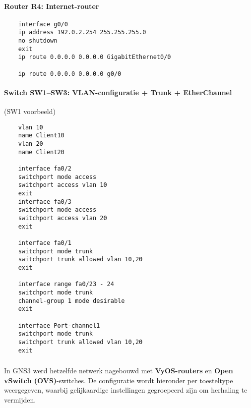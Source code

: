 \vspace{0.3cm}

\paragraph{Router R4: Internet-router}
\begin{verbatim}
    interface g0/0
    ip address 192.0.2.254 255.255.255.0
    no shutdown
    exit
    ip route 0.0.0.0 0.0.0.0 GigabitEthernet0/0
    
    ip route 0.0.0.0 0.0.0.0 g0/0
\end{verbatim}

\vspace{0.3cm}
\paragraph{Switch SW1–SW3: VLAN-configuratie + Trunk + EtherChannel}
(SW1 voorbeeld)
\begin{verbatim}
    vlan 10
    name Client10
    vlan 20
    name Client20
    
    interface fa0/2
    switchport mode access
    switchport access vlan 10
    exit
    interface fa0/3
    switchport mode access
    switchport access vlan 20
    exit
    
    interface fa0/1
    switchport mode trunk
    switchport trunk allowed vlan 10,20
    exit
    
    interface range fa0/23 - 24
    switchport mode trunk
    channel-group 1 mode desirable
    exit
    
    interface Port-channel1
    switchport mode trunk
    switchport trunk allowed vlan 10,20
    exit
\end{verbatim}



\subsubsection{}
\label{sec:configuratie-Gns3}

\subsubsection{}
\label{sec:configuratie-GNS3}

In GNS3 werd hetzelfde netwerk nagebouwd met \textbf{VyOS-routers} en \textbf{Open vSwitch (OVS)}-switches. De configuratie wordt hieronder per toesteltype weergegeven, waarbij gelijkaardige instellingen gegroepeerd zijn om herhaling te vermijden.

